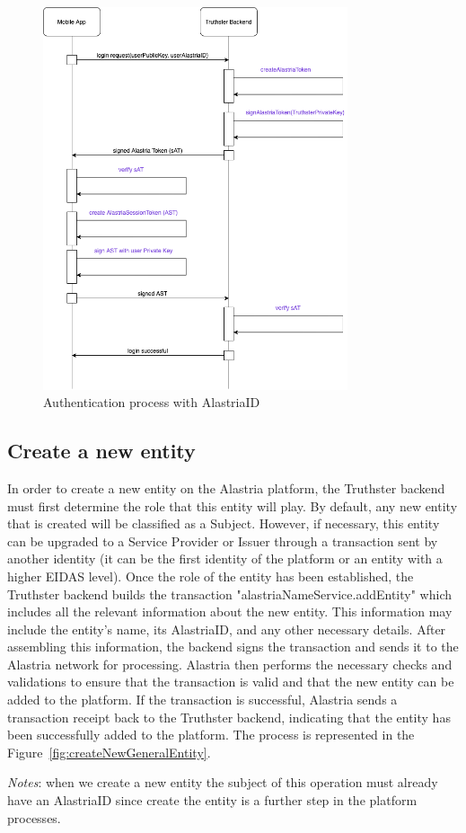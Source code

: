\documentclass[target=mst,aauheader=]{thud}
\begin{document}
\begin{figure}
    \centering
    \includegraphics[width=0.8\textwidth]{images/authenticationAlastriaID.png}
    \caption{Authentication process with AlastriaID}
\end{figure}


\subsection{Create a new entity}

In order to create a new entity on the Alastria platform, the Truthster backend must first determine the role that this entity will play. By default, any new entity that is created will be classified as a Subject. However, if necessary, this entity can be upgraded to a Service Provider or Issuer through a transaction sent by another identity (it can be the first identity of the platform or an entity with a higher EIDAS level).
Once the role of the entity has been established, the Truthster backend builds the transaction "alastriaNameService.addEntity" which includes all the relevant information about the new entity. This information may include the entity's name, its AlastriaID, and any other necessary details. After assembling this information, the backend signs the transaction and sends it to the Alastria network for processing.
Alastria then performs the necessary checks and validations to ensure that the transaction is valid and that the new entity can be added to the platform. If the transaction is successful, Alastria sends a transaction receipt back to the Truthster backend, indicating that the entity has been successfully added to the platform.
The process is represented in the Figure~\ref{fig:createNewGeneralEntity}.\par
\textit{Notes}: when we create a new entity the subject of this operation must already have an AlastriaID since create the entity is a further step in the platform processes.
\end{document}

